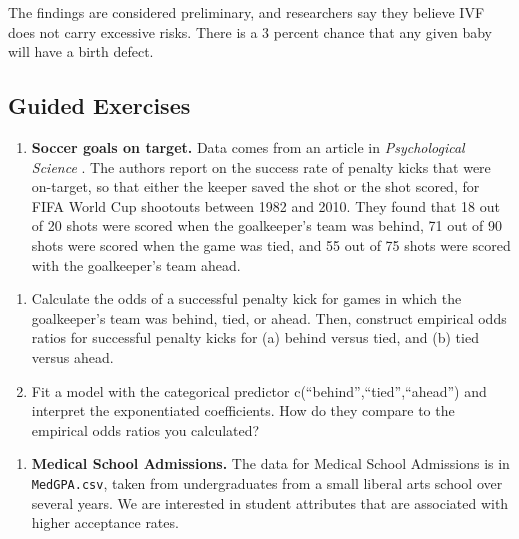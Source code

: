 \documentclass[
]{krantz}
\providecommand{\tightlist}{%
  \setlength{\itemsep}{0pt}\setlength{\parskip}{0pt}}
\renewenvironment{quote}{\begin{VF}}{\end{VF}}
\begin{document}
\begin{quote}
The findings are considered preliminary, and researchers say they believe IVF does not carry excessive risks. There is a 3 percent chance that any given baby will have a birth defect.
\end{quote}

\hypertarget{guided-exercises-3}{%
\subsection{Guided Exercises}\label{guided-exercises-3}}

\begin{enumerate}
\def\labelenumi{\arabic{enumi}.}
\tightlist
\item
  \textbf{Soccer goals on target.} Data comes from an article in \emph{Psychological Science} \citep{Roskes2011}. The authors report on the success rate of penalty kicks that were on-target, so that either the keeper saved the shot or the shot scored, for FIFA World Cup shootouts between 1982 and 2010. They found that 18 out of 20 shots were scored when the goalkeeper's team was behind, 71 out of 90 shots were scored when the game was tied, and 55 out of 75 shots were scored with the goalkeeper's team ahead.
\end{enumerate}

\begin{enumerate}
\def\labelenumi{\alph{enumi}.}
\item
  Calculate the odds of a successful penalty kick for games in which the goalkeeper's team was behind, tied, or ahead. Then, construct empirical odds ratios for successful penalty kicks for (a) behind versus tied, and (b) tied versus ahead.
\item
  Fit a model with the categorical predictor c(``behind'',``tied'',``ahead'') and interpret the exponentiated coefficients. How do they compare to the empirical odds ratios you calculated?
\end{enumerate}

\begin{enumerate}
\def\labelenumi{\arabic{enumi}.}
\setcounter{enumi}{1}
\tightlist
\item
  \textbf{Medical School Admissions.} The data for Medical School Admissions is in \texttt{MedGPA.csv}, taken from undergraduates from a small liberal arts school over several years. We are interested in student attributes that are associated with higher acceptance rates.
\end{enumerate}
\end{document}
